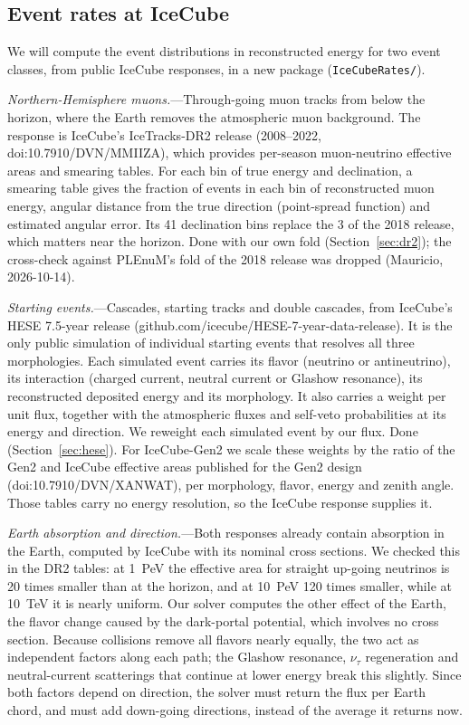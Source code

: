 \documentclass[11pt,a4paper]{article}
\newcommand{\file}[1]{\nolinkurl{#1}}
\begin{document}
\subsection{Event rates at IceCube}
\label{sec:rates}

We will compute the event distributions in reconstructed energy for two event classes, from
public IceCube responses, in a new package (\file{IceCubeRates/}).

\textit{Northern-Hemisphere muons.}---Through-going muon tracks from below the horizon, where
the Earth removes the atmospheric muon background. The response is IceCube's IceTracks-DR2
release (2008--2022, doi:10.7910/DVN/MMIIZA), which provides per-season muon-neutrino effective
areas and smearing tables. For each bin of true energy and declination, a smearing table gives
the fraction of events in each bin of reconstructed muon energy, angular distance from the true
direction (point-spread function) and estimated angular error. Its 41 declination bins replace the 3 of the 2018
release, which matters near the horizon. Done with our own fold (Section~\ref{sec:dr2}); the
cross-check against PLEnuM's fold of the 2018 release was dropped (Mauricio, 2026-10-14).

\textit{Starting events.}---Cascades, starting tracks and double cascades, from IceCube's HESE
7.5-year release (github.com/icecube/HESE-7-year-data-release). It is the only public
simulation of individual starting events that resolves all three morphologies. Each simulated
event carries its flavor (neutrino or antineutrino), its interaction (charged current, neutral
current or Glashow resonance), its reconstructed deposited energy and its morphology. It also
carries a weight per unit flux, together with the atmospheric fluxes and self-veto probabilities
at its energy and direction. We reweight each simulated event by our flux. Done (Section~\ref{sec:hese}). For IceCube-Gen2 we
scale these weights by the ratio of the Gen2 and IceCube effective areas published for the
Gen2 design (doi:10.7910/DVN/XANWAT), per morphology, flavor, energy and zenith angle. Those
tables carry no energy resolution, so the IceCube response supplies it.

\textit{Earth absorption and direction.}---Both responses already contain absorption in the
Earth, computed by IceCube with its nominal cross sections. We checked this in the DR2 tables:
at 1~PeV the effective area for straight up-going neutrinos is 20 times smaller than at the
horizon, and at 10~PeV 120 times smaller, while at 10~TeV it is nearly uniform. Our solver computes the other effect of the Earth,
the flavor change caused by the dark-portal potential, which involves no cross section. Because
collisions remove all flavors nearly equally, the two act as independent factors along each
path; the Glashow resonance, $\nu_\tau$ regeneration and neutral-current scatterings that
continue at lower energy break this slightly. Since both factors depend on direction, the solver
must return the flux per Earth chord, and must add down-going directions, instead of the
average it returns now.
\end{document}
